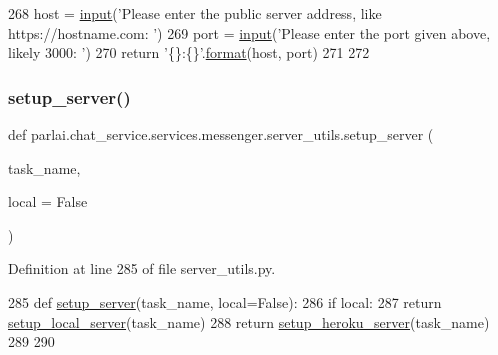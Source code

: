\begin{DoxyCode}
268     host = \hyperlink{namespaceparlai_1_1mturk_1_1core_1_1dev_1_1test_1_1test__full__system_a1e1817cd65688fb90f827834d1fb4567}{input}(\textcolor{stringliteral}{'Please enter the public server address, like https://hostname.com: '})
269     port = \hyperlink{namespaceparlai_1_1mturk_1_1core_1_1dev_1_1test_1_1test__full__system_a1e1817cd65688fb90f827834d1fb4567}{input}(\textcolor{stringliteral}{'Please enter the port given above, likely 3000: '})
270     \textcolor{keywordflow}{return} \textcolor{stringliteral}{'\{\}:\{\}'}.\hyperlink{namespaceparlai_1_1chat__service_1_1services_1_1messenger_1_1shared__utils_a32e2e2022b824fbaf80c747160b52a76}{format}(host, port)
271 
272 
\end{DoxyCode}
\mbox{\label{namespaceparlai_1_1chat__service_1_1services_1_1messenger_1_1server__utils_afb56b04206cd0f42384438f1ac6d9cda}} 
\subsubsection{\texorpdfstring{setup\+\_\+server()}{setup\_server()}}
{\footnotesize\ttfamily def parlai.\+chat\+\_\+service.\+services.\+messenger.\+server\+\_\+utils.\+setup\+\_\+server (\begin{DoxyParamCaption}\item[{}]{task\+\_\+name,  }\item[{}]{local = {\ttfamily False} }\end{DoxyParamCaption})}



Definition at line 285 of file server\+\_\+utils.\+py.


\begin{DoxyCode}
285 \textcolor{keyword}{def }\hyperlink{namespaceparlai_1_1mturk_1_1core_1_1server__utils_a154e8cbb18375ff8fd6730154d312bbc}{setup\_server}(task\_name, local=False):
286     \textcolor{keywordflow}{if} local:
287         \textcolor{keywordflow}{return} \hyperlink{namespaceparlai_1_1mturk_1_1core_1_1server__utils_a9d4c4937ea60bd74630a44739e825ebf}{setup\_local\_server}(task\_name)
288     \textcolor{keywordflow}{return} \hyperlink{namespaceparlai_1_1mturk_1_1core_1_1server__utils_af1c97e9b93a403e200ac75b87a51c3c1}{setup\_heroku\_server}(task\_name)
289 
290 
\end{DoxyCode}


